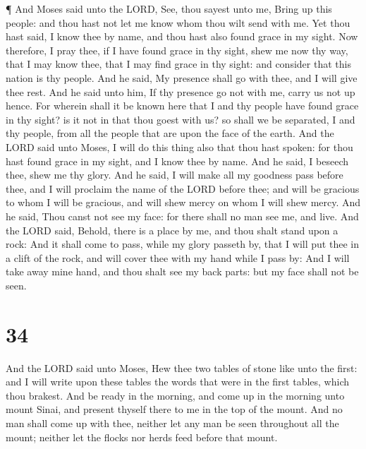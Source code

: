  ¶ And Moses said unto the LORD, See, thou sayest unto me,
Bring up this people: and thou hast not let me know whom thou wilt send
with me. Yet thou hast said, I know thee by name, and thou hast also
found grace in my sight.  Now therefore, I pray thee, if I
have found grace in thy sight, shew me now thy way, that I may know
thee, that I may find grace in thy sight: and consider that this nation
is thy people.  And he said, My presence shall go with
thee, and I will give thee rest.  And he said unto him, If
thy presence go not with me, carry us not up hence.  For
wherein shall it be known here that I and thy people have found grace in
thy sight? is it not in that thou goest with us? so shall we be
separated, I and thy people, from all the people that are upon the face
of the earth.  And the LORD said unto Moses, I will do this
thing also that thou hast spoken: for thou hast found grace in my sight,
and I know thee by name.  And he said, I beseech thee, shew
me thy glory.  And he said, I will make all my goodness
pass before thee, and I will proclaim the name of the LORD before thee;
and will be gracious to whom I will be gracious, and will shew mercy on
whom I will shew mercy.  And he said, Thou canst not see my
face: for there shall no man see me, and live.  And the
LORD said, Behold, there is a place by me, and thou shalt stand upon a
rock:  And it shall come to pass, while my glory passeth
by, that I will put thee in a clift of the rock, and will cover thee
with my hand while I pass by:  And I will take away mine
hand, and thou shalt see my back parts: but my face shall not be seen.

\hypertarget{section-33}{%
\section{34}\label{section-33}}

 And the LORD said unto Moses, Hew thee two tables of stone
like unto the first: and I will write upon these tables the words that
were in the first tables, which thou brakest.  And be ready
in the morning, and come up in the morning unto mount Sinai, and present
thyself there to me in the top of the mount.  And no man
shall come up with thee, neither let any man be seen throughout all the
mount; neither let the flocks nor herds feed before that mount.

